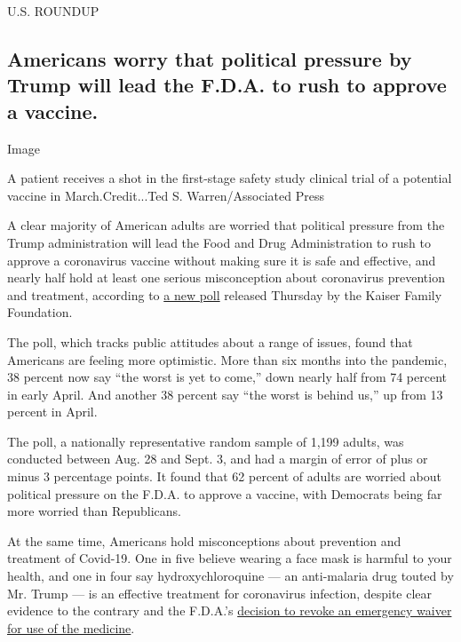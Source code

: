 U.S. ROUNDUP

\hypertarget{americans-worry-that-political-pressure-by-trump-will-lead-the-fda-to-rush-to-approve-a-vaccine}{%
\subsection{Americans worry that political pressure by Trump will lead
the F.D.A. to rush to approve a
vaccine.}\label{americans-worry-that-political-pressure-by-trump-will-lead-the-fda-to-rush-to-approve-a-vaccine}}

Image

A patient receives a shot in the first-stage safety study clinical trial
of a potential vaccine in March.Credit...Ted S. Warren/Associated Press

A clear majority of American adults are worried that political pressure
from the Trump administration will lead the Food and Drug Administration
to rush to approve a coronavirus vaccine without making sure it is safe
and effective, and nearly half hold at least one serious misconception
about coronavirus prevention and treatment, according to
\href{https://www.kff.org/coronavirus-covid-19/report/kff-health-tracking-poll-september-2020/}{a
new poll} released Thursday by the Kaiser Family Foundation.

The poll, which tracks public attitudes about a range of issues, found
that Americans are feeling more optimistic. More than six months into
the pandemic, 38 percent now say ``the worst is yet to come,'' down
nearly half from 74 percent in early April. And another 38 percent say
``the worst is behind us,'' up from 13 percent in April.

The poll, a nationally representative random sample of 1,199 adults, was
conducted between Aug. 28 and Sept. 3, and had a margin of error of plus
or minus 3 percentage points. It found that 62 percent of adults are
worried about political pressure on the F.D.A. to approve a vaccine,
with Democrats being far more worried than Republicans.

At the same time, Americans hold misconceptions about prevention and
treatment of Covid-19. One in five believe wearing a face mask is
harmful to your health, and one in four say hydroxychloroquine --- an
anti-malaria drug touted by Mr. Trump --- is an effective treatment for
coronavirus infection, despite clear evidence to the contrary and the
F.D.A.'s
\href{https://www.nytimes3xbfgragh.onion/2020/06/15/health/fda-hydroxychloroquine-malaria.html}{decision
to revoke an emergency waiver for use of the medicine}.

